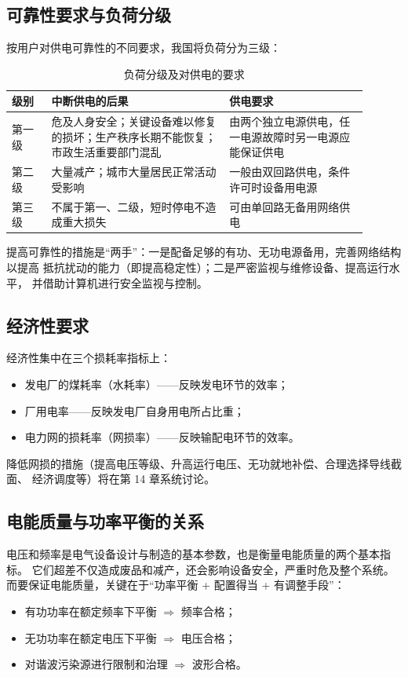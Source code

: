 \subsection{可靠性要求与负荷分级}

按用户对供电可靠性的不同要求，我国将负荷分为三级：

\begin{table}[htbp]
  \centering
  \caption{负荷分级及对供电的要求}
  \small
  \begin{tabular}{@{}p{0.10\linewidth}p{0.45\linewidth}p{0.35\linewidth}@{}}
    \toprule
    级别 & 中断供电的后果 & 供电要求 \\
    \midrule
    第一级 & 危及人身安全；关键设备难以修复的损坏；生产秩序长期不能恢复；
             市政生活重要部门混乱 & 由两个独立电源供电，任一电源故障时另一电源应能保证供电 \\
    第二级 & 大量减产；城市大量居民正常活动受影响 & 一般由双回路供电，条件许可时设备用电源 \\
    第三级 & 不属于第一、二级，短时停电不造成重大损失 & 可由单回路无备用网络供电 \\
    \bottomrule
  \end{tabular}
\end{table}

提高可靠性的措施是“两手”：一是配备足够的有功、无功电源备用，完善网络结构以提高
抵抗扰动的能力（即提高稳定性）；二是严密监视与维修设备、提高运行水平，
并借助计算机进行安全监视与控制。

\subsection{经济性要求}

经济性集中在三个损耗率指标上：
\begin{itemize}
  \item 发电厂的煤耗率（水耗率）——反映发电环节的效率；
  \item 厂用电率——反映发电厂自身用电所占比重；
  \item 电力网的损耗率（网损率）——反映输配电环节的效率。
\end{itemize}
降低网损的措施（提高电压等级、升高运行电压、无功就地补偿、合理选择导线截面、
经济调度等）将在第 14 章系统讨论。

\subsection{电能质量与功率平衡的关系}

电压和频率是电气设备设计与制造的基本参数，也是衡量电能质量的两个基本指标。
它们超差不仅造成废品和减产，还会影响设备安全，严重时危及整个系统。
而要保证电能质量，关键在于“功率平衡 + 配置得当 + 有调整手段”：
\begin{itemize}
  \item 有功功率在额定频率下平衡 $\Rightarrow$ 频率合格；
  \item 无功功率在额定电压下平衡 $\Rightarrow$ 电压合格；
  \item 对谐波污染源进行限制和治理 $\Rightarrow$ 波形合格。
\end{itemize}

